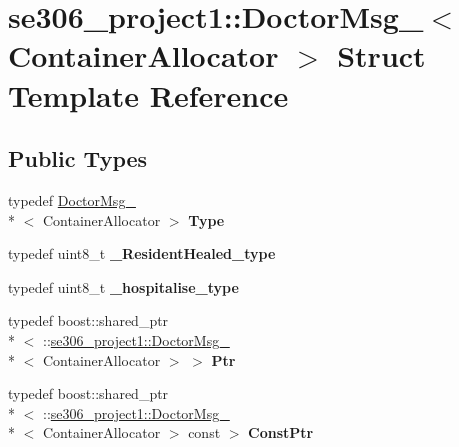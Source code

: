 \hypertarget{structse306__project1_1_1DoctorMsg__}{\section{se306\-\_\-project1\-:\-:Doctor\-Msg\-\_\-$<$ Container\-Allocator $>$ Struct Template Reference}
\label{structse306__project1_1_1DoctorMsg__}
}
\subsection*{Public Types}
\begin{DoxyCompactItemize}
\item 
\hypertarget{structse306__project1_1_1DoctorMsg___a00781357575cf134c091219ee53d0a94}{typedef \hyperlink{structse306__project1_1_1DoctorMsg__}{Doctor\-Msg\-\_\-}\\*
$<$ Container\-Allocator $>$ {\bfseries Type}}\label{structse306__project1_1_1DoctorMsg___a00781357575cf134c091219ee53d0a94}

\item 
\hypertarget{structse306__project1_1_1DoctorMsg___ab3b22428daa95b3a0a085e3b64af8d39}{typedef uint8\-\_\-t {\bfseries \-\_\-\-Resident\-Healed\-\_\-type}}\label{structse306__project1_1_1DoctorMsg___ab3b22428daa95b3a0a085e3b64af8d39}

\item 
\hypertarget{structse306__project1_1_1DoctorMsg___a87354ca763be48d0e501a23f1870268c}{typedef uint8\-\_\-t {\bfseries \-\_\-hospitalise\-\_\-type}}\label{structse306__project1_1_1DoctorMsg___a87354ca763be48d0e501a23f1870268c}

\item 
\hypertarget{structse306__project1_1_1DoctorMsg___a8a5d1bbf5000de3e2d58770fc41be09d}{typedef boost\-::shared\-\_\-ptr\\*
$<$ \-::\hyperlink{structse306__project1_1_1DoctorMsg__}{se306\-\_\-project1\-::\-Doctor\-Msg\-\_\-}\\*
$<$ Container\-Allocator $>$ $>$ {\bfseries Ptr}}\label{structse306__project1_1_1DoctorMsg___a8a5d1bbf5000de3e2d58770fc41be09d}

\item 
\hypertarget{structse306__project1_1_1DoctorMsg___af7d7e47c79b0848918536b70a58a4a8e}{typedef boost\-::shared\-\_\-ptr\\*
$<$ \-::\hyperlink{structse306__project1_1_1DoctorMsg__}{se306\-\_\-project1\-::\-Doctor\-Msg\-\_\-}\\*
$<$ Container\-Allocator $>$ const  $>$ {\bfseries Const\-Ptr}}\label{structse306__project1_1_1DoctorMsg___af7d7e47c79b0848918536b70a58a4a8e}

\end{DoxyCompactItemize}

